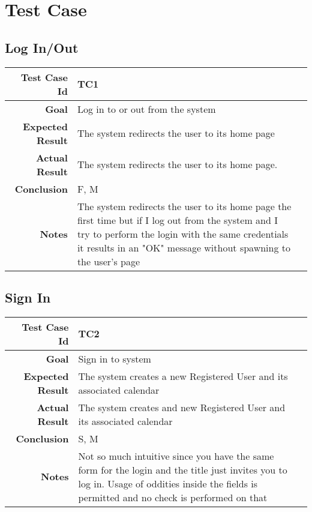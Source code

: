 \chapter{Test Case} \label{cap:cap3}
\section{Log In/Out}
\begin{tabularx}{\linewidth}{|r|X|X|}

  \hline   {\bf Test Case Id} &  TC1\\
  \hline  {\bf Goal} & Log in to or out from the system\\
  \hline  {\bf Expected Result} & The system redirects the user to its home page\\
  \hline  {\bf Actual Result} & The system redirects the user to its home page.\\
  \hline  {\bf Conclusion} & F, M\\
  \hline  {\bf Notes} &  The system redirects the user to its home page the first time but if I log out from the system and I try to perform the login with the same credentials it results in an "OK" message without spawning to the user's page \\
  \hline
  
\end{tabularx}

\section{Sign In}
\begin{tabularx}{\linewidth}{|r|X|X|}

  \hline   {\bf Test Case Id} &  TC2\\
  \hline  {\bf Goal} & Sign in to system\\
  
  \hline  {\bf Expected Result} & The system creates a new Registered User and its associated calendar\\
  \hline  {\bf Actual Result} & The system creates and new Registered User and its associated calendar\\
  \hline  {\bf Conclusion} & S, M\\
  \hline  {\bf Notes} & Not so much intuitive since you have the same form for the login and the title just invites you to log in. Usage of oddities inside the fields is permitted and no check is performed on that\\
  \hline
  
\end{tabularx}

